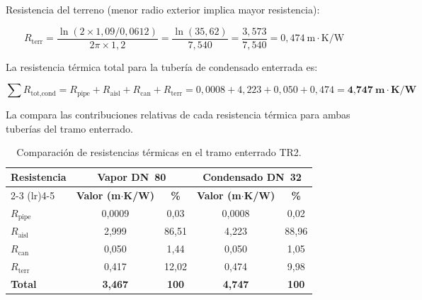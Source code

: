 Resistencia del terreno (menor radio exterior implica mayor resistencia):

\begin{equation}
	R_{\text{terr}} = \frac{\ln(2 \times 1{,}09 / 0{,}0612)}{2\pi \times 1{,}2} = \frac{\ln(35{,}62)}{7{,}540} = \frac{3{,}573}{7{,}540} = 0{,}474~\text{m}\cdot\text{K/W}
	\label{eq:resist_terr_TR2_cond}
\end{equation}

La resistencia térmica total para la tubería de condensado enterrada es:

\begin{equation}
	\sum R_{\text{tot,cond}} = R_{\text{pipe}} + R_{\text{aisl}} + R_{\text{can}} + R_{\text{terr}} = 0{,}0008 + 4{,}223 + 0{,}050 + 0{,}474 = \textbf{4{,}747}~\textbf{m}\cdot\textbf{K/W}
	\label{eq:resist_total_TR2_cond}
\end{equation}

La  compara las contribuciones relativas de cada resistencia térmica para ambas tuberías del tramo enterrado.

\begin{table}[htbp]
	\centering
	\caption{Comparación de resistencias térmicas en el tramo enterrado TR2.}
	\label{tab:resistencias_TR2}
	\begin{tabular}{lcccc}
		\toprule
		\textbf{Resistencia} & \multicolumn{2}{c}{\textbf{Vapor DN~80}} & \multicolumn{2}{c}{\textbf{Condensado DN~32}}                                               \\
		\cmidrule(lr){2-3} \cmidrule(lr){4-5}
		                     & \textbf{Valor (m$\cdot$K/W)}             & \textbf{\%}                                   & \textbf{Valor (m$\cdot$K/W)} & \textbf{\%}  \\
		\midrule
		$R_{\text{pipe}}$    & 0{,}0009                                 & 0{,}03                                        & 0{,}0008                     & 0{,}02       \\
		$R_{\text{aisl}}$    & 2{,}999                                  & 86{,}51                                       & 4{,}223                      & 88{,}96      \\
		$R_{\text{can}}$     & 0{,}050                                  & 1{,}44                                        & 0{,}050                      & 1{,}05       \\
		$R_{\text{terr}}$    & 0{,}417                                  & 12{,}02                                       & 0{,}474                      & 9{,}98       \\
		\midrule
		\textbf{Total}       & \textbf{3{,}467}                         & \textbf{100}                                  & \textbf{4{,}747}             & \textbf{100} \\
		\bottomrule
	\end{tabular}
\end{table}

